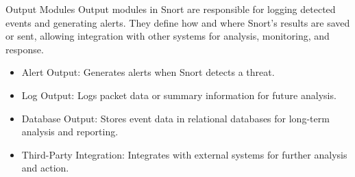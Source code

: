 \begin{frame}[t]{Output Modules}
  \fontsize{13.5}{16.5}\selectfont
  \vspace{0.1cm}
  Output modules in Snort are responsible for logging detected events and generating alerts. They define how and where Snort's results are saved or sent, allowing integration with other systems for analysis, monitoring, and response.
  \vspace{0.15cm}
  \begin{itemize}
    \item \textcolor{WarningColor}{Alert Output:} Generates alerts when Snort detects a threat.
    \item \textcolor{WarningColor}{Log Output:} Logs packet data or summary information for future analysis.
    \item \textcolor{WarningColor}{Database Output:} Stores event data in relational databases for long-term analysis and reporting.
    \item \textcolor{WarningColor}{Third-Party Integration:} Integrates with external systems for further analysis and action.
  \end{itemize}
\end{frame}
